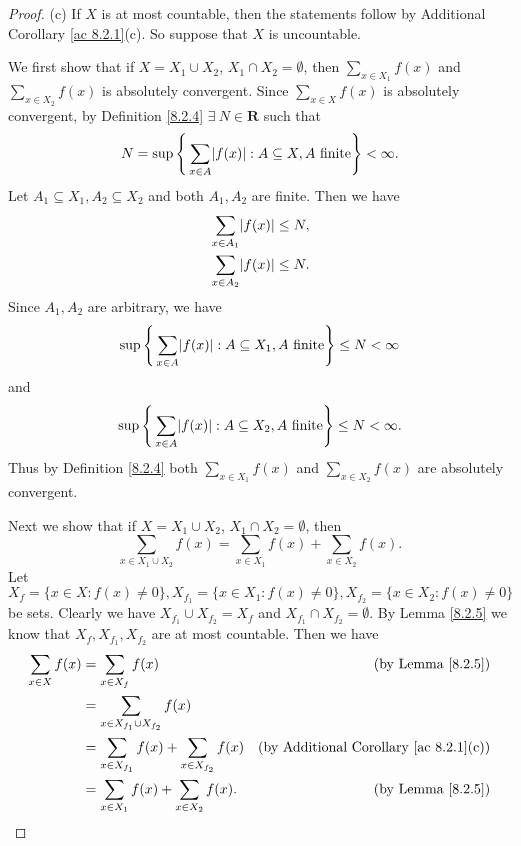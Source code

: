 \begin{proof}{(c)}
    If \(X\) is at most countable, then the statements follow by Additional Corollary \ref{ac 8.2.1}(c).
    So suppose that \(X\) is uncountable.

    We first show that if \(X = X_1 \cup X_2\), \(X_1 \cap X_2 = \emptyset\), then \(\sum_{x \in X_1} f(x)\) and \(\sum_{x \in X_2} f(x)\) is absolutely convergent.
    Since \(\sum_{x \in X} f(x)\) is absolutely convergent, by Definition \ref{8.2.4} \(\exists\ N \in \mathbf{R}\) such that
    \[
        N = \sup\Bigg\{\sum_{x \in A} \abs*{f(x)} : A \subseteq X, A \text{ finite}\Bigg\} < \infty.
    \]
    Let \(A_1 \subseteq X_1, A_2 \subseteq X_2\) and both \(A_1, A_2\) are finite.
    Then we have
    \begin{align*}
         & \sum_{x \in A_1} \abs*{f(x)} \leq N, \\
         & \sum_{x \in A_2} \abs*{f(x)} \leq N.
    \end{align*}
    Since \(A_1, A_2\) are arbitrary, we have
    \[
        \sup\Bigg\{\sum_{x \in A} \abs*{f(x)} : A \subseteq X_1, A \text{ finite}\Bigg\} \leq N < \infty
    \]
    and
    \[
        \sup\Bigg\{\sum_{x \in A} \abs*{f(x)} : A \subseteq X_2, A \text{ finite}\Bigg\} \leq N < \infty.
    \]
    Thus by Definition \ref{8.2.4} both \(\sum_{x \in X_1} f(x)\) and \(\sum_{x \in X_2} f(x)\) are absolutely convergent.

    Next we show that if \(X = X_1 \cup X_2\), \(X_1 \cap X_2 = \emptyset\), then
    \[
        \sum_{x \in X_1 \cup X_2} f(x) = \sum_{x \in X_1} f(x) + \sum_{x \in X_2} f(x).
    \]
    Let \(X_f = \{x \in X : f(x) \neq 0\}, X_{f_1} = \{x \in X_1 : f(x) \neq 0\}, X_{f_2} = \{x \in X_2 : f(x) \neq 0\}\) be sets.
    Clearly we have \(X_{f_1} \cup X_{f_2} = X_f\) and \(X_{f_1} \cap X_{f_2} = \emptyset\).
    By Lemma \ref{8.2.5} we know that \(X_f, X_{f_1}, X_{f_2}\) are at most countable.
    Then we have
    \begin{align*}
        \sum_{x \in X} f(x) & = \sum_{x \in X_f} f(x)                                 & \text{(by Lemma \ref{8.2.5})}                      \\
                            & = \sum_{x \in X_{f_1} \cup X_{f_2}} f(x)                                                                     \\
                            & = \sum_{x \in X_{f_1}} f(x) + \sum_{x \in X_{f_2}} f(x) & \text{(by Additional Corollary \ref{ac 8.2.1}(c))} \\
                            & = \sum_{x \in X_1} f(x) + \sum_{x \in X_2} f(x).        & \text{(by Lemma \ref{8.2.5})}
    \end{align*}


\end{proof}

